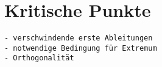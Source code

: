 %
%
%
\section{Kritische Punkte
\label{buch:fuvar:section:kritisch}}

\begin{verbatim}
- verschwindende erste Ableitungen
- notwendige Bedingung für Extremum
- Orthogonalität
\end{verbatim}
